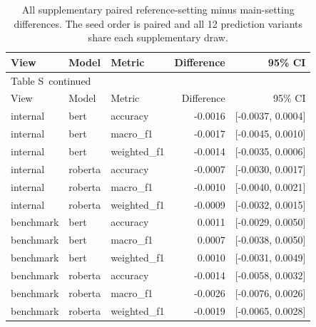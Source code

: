 \documentclass[10pt,a4paper]{article}
\renewcommand{\thetable}{S\arabic{table}}
\begin{document}
{\small
\setlength{\tabcolsep}{4pt}
\begin{longtable}{@{}lllrr@{}}
\caption{All supplementary paired reference-setting minus main-setting differences. The seed order is paired and all 12 prediction variants share each supplementary draw.}\label{sup:ref14-deltas}\\
\toprule
View & Model & Metric & Difference & 95\% CI \\
\midrule\endfirsthead
\multicolumn{5}{l}{\small Table \thetable\ continued}\\
\toprule
View & Model & Metric & Difference & 95\% CI \\
\midrule\endhead
\bottomrule\endfoot
internal & bert & accuracy & -0.0016 & [-0.0037, 0.0004] \\
internal & bert & macro\_f1 & -0.0017 & [-0.0045, 0.0010] \\
internal & bert & weighted\_f1 & -0.0014 & [-0.0035, 0.0006] \\
internal & roberta & accuracy & -0.0007 & [-0.0030, 0.0017] \\
internal & roberta & macro\_f1 & -0.0010 & [-0.0040, 0.0021] \\
internal & roberta & weighted\_f1 & -0.0009 & [-0.0032, 0.0015] \\
benchmark & bert & accuracy & 0.0011 & [-0.0029, 0.0050] \\
benchmark & bert & macro\_f1 & 0.0007 & [-0.0038, 0.0050] \\
benchmark & bert & weighted\_f1 & 0.0010 & [-0.0031, 0.0049] \\
benchmark & roberta & accuracy & -0.0014 & [-0.0058, 0.0032] \\
benchmark & roberta & macro\_f1 & -0.0026 & [-0.0076, 0.0026] \\
benchmark & roberta & weighted\_f1 & -0.0019 & [-0.0065, 0.0028] \\
\end{longtable}
}
\end{document}
